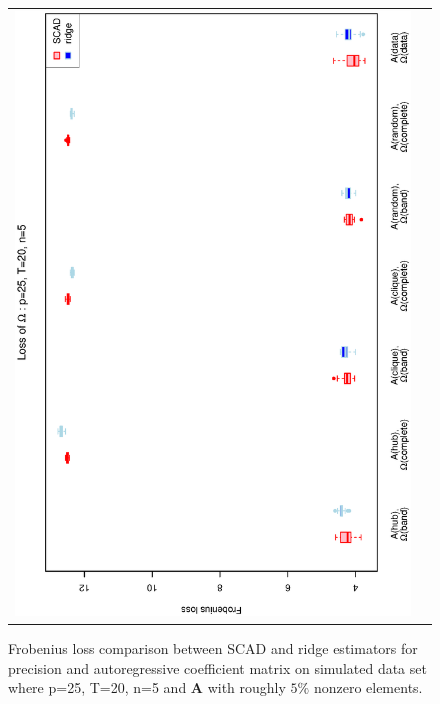 \documentclass[a4paper]{article}
\begin{document}
\begin{figure}[h!]
\begin{tabular}{cc}
\includegraphics[scale=0.45,angle=270]{LossOmega25T20N5_5.eps}
\end{tabular}
\caption{Frobenius loss comparison between SCAD and ridge estimators for precision and autoregressive coefficient matrix on simulated data set where p=25, T=20, n=5  and $\mathbf{A}$ with roughly $5\%$ nonzero elements.}
\label{figSM:Loss25T20N5_5}
\end{figure}

\end{document}
